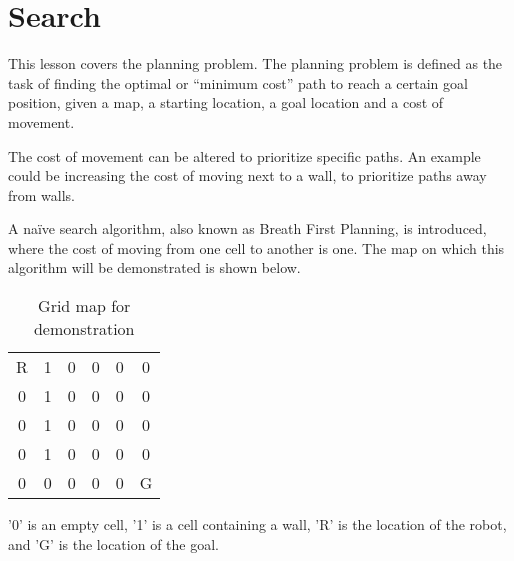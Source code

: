 \documentclass[Main]{subfiles}
\begin{document}
\section{Search} %
	\label{sec:search}

This lesson covers the planning problem. 
The planning problem is defined as the task of finding the optimal or “minimum cost” path to reach a certain goal position, given a map, a starting location, a goal location and a cost of movement.

The cost of movement can be altered to prioritize specific paths. 
An example could be increasing the cost of moving next to a wall, to prioritize paths away from walls. 

A naïve search algorithm, also known as Breath First Planning, is introduced, where the cost of moving from one cell to another is one. 
The map on which this algorithm will be demonstrated is shown below.
\begin{table}[H]
	\centering
	\begin{tabular}{cccccc}
		R & 1 & 0 & 0 & 0 & 0  \\ 
		0 & 1 & 0 & 0 & 0 & 0  \\ 
		0 & 1 & 0 & 0 & 0 & 0  \\ 
		0 & 1 & 0 & 0 & 0 & 0  \\  
		0 & 0 & 0 & 0 & 0 & G  \\ 
	\end{tabular}
\caption{Grid map for demonstration}
\label{table:grid_map} 
\end{table} \noindent
'0' is an empty cell, '1' is a cell containing a wall, 'R' is the location of the robot, and 'G' is the location of the goal.
\end{document}
